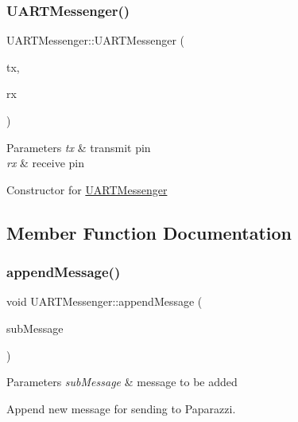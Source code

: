 \subsubsection{\texorpdfstring{U\+A\+R\+T\+Messenger()}{UARTMessenger()}}
{\footnotesize\ttfamily U\+A\+R\+T\+Messenger\+::\+U\+A\+R\+T\+Messenger (\begin{DoxyParamCaption}\item[{Pin\+Name}]{tx,  }\item[{Pin\+Name}]{rx }\end{DoxyParamCaption})}


\begin{DoxyParams}{Parameters}
{\em tx} & transmit pin \\
\hline
{\em rx} & receive pin\\
\hline
\end{DoxyParams}
Constructor for \hyperlink{class_u_a_r_t_messenger}{U\+A\+R\+T\+Messenger} 

\subsection{Member Function Documentation}
\mbox{\label{class_u_a_r_t_messenger_ada0967869e320c236a211b405abf128a}} 
\subsubsection{\texorpdfstring{append\+Message()}{appendMessage()}}
{\footnotesize\ttfamily void U\+A\+R\+T\+Messenger\+::append\+Message (\begin{DoxyParamCaption}\item[{const \hyperlink{struct_sub_message}{Sub\+Message} \&}]{sub\+Message }\end{DoxyParamCaption})}


\begin{DoxyParams}{Parameters}
{\em sub\+Message} & message to be added\\
\hline
\end{DoxyParams}
Append new message for sending to Paparazzi. \mbox{\label{class_u_a_r_t_messenger_affb33ad31e70001505e14d02e1f8a018}} 
